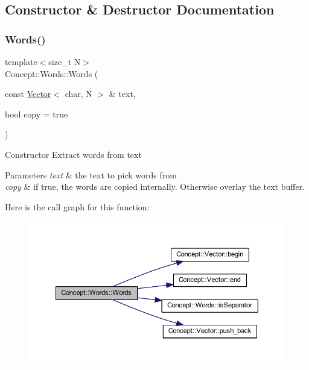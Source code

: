 \subsection{Constructor \& Destructor Documentation}
\mbox{\label{class_concept_1_1_words_a8a8447c2038540ffcdf0052e0edec2c4}} 
\subsubsection{\texorpdfstring{Words()}{Words()}}
{\footnotesize\ttfamily template$<$size\+\_\+t N$>$ \\
Concept\+::\+Words\+::\+Words (\begin{DoxyParamCaption}\item[{const \mbox{\hyperlink{class_concept_1_1_vector}{Vector}}$<$ char, N $>$ \&}]{text,  }\item[{bool}]{copy = {\ttfamily true} }\end{DoxyParamCaption})\hspace{0.3cm}{\ttfamily [inline]}}

Constructor Extract words from text 
\begin{DoxyParams}{Parameters}
{\em text} & the text to pick words from \\
\hline
{\em copy} & if true, the words are copied internally. Otherwise overlay the text buffer. \\
\hline
\end{DoxyParams}
Here is the call graph for this function\+:\nopagebreak
\begin{figure}[H]
\begin{center}
\leavevmode
\includegraphics[width=350pt]{class_concept_1_1_words_a8a8447c2038540ffcdf0052e0edec2c4_cgraph}
\end{center}
\end{figure}


